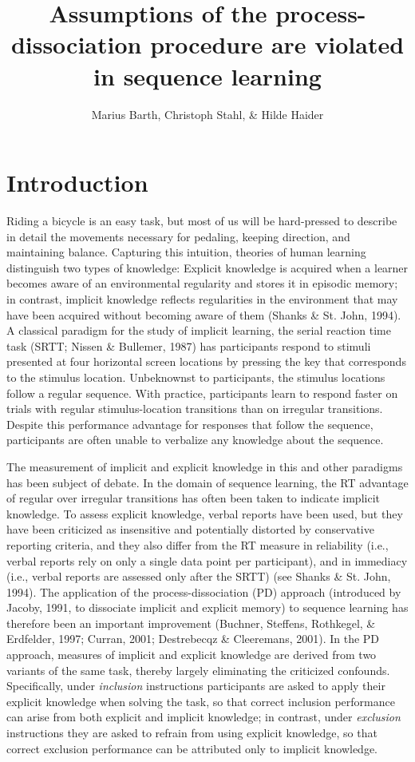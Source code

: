 \documentclass[floatsintext,man]{apa6}
\title{Assumptions of the process-dissociation procedure are violated in
sequence learning}
\author{Marius Barth, Christoph Stahl, \& Hilde Haider}
\affiliation{
    \vspace{0.5cm}
          \textsuperscript{} University of Cologne  }
\begin{document}
\maketitle



\section{Introduction}\label{introduction}

Riding a bicycle is an easy task, but most of us will be hard-pressed to
describe in detail the movements necessary for pedaling, keeping
direction, and maintaining balance. Capturing this intuition, theories
of human learning distinguish two types of knowledge: Explicit knowledge
is acquired when a learner becomes aware of an environmental regularity
and stores it in episodic memory; in contrast, implicit knowledge
reflects regularities in the environment that may have been acquired
without becoming aware of them (Shanks \& St. John, 1994). A classical
paradigm for the study of implicit learning, the serial reaction time
task (SRTT; Nissen \& Bullemer, 1987) has participants respond to
stimuli presented at four horizontal screen locations by pressing the
key that corresponds to the stimulus location. Unbeknownst to
participants, the stimulus locations follow a regular sequence. With
practice, participants learn to respond faster on trials with regular
stimulus-location transitions than on irregular transitions. Despite
this performance advantage for responses that follow the sequence,
participants are often unable to verbalize any knowledge about the
sequence.

The measurement of implicit and explicit knowledge in this and other
paradigms has been subject of debate. In the domain of sequence
learning, the RT advantage of regular over irregular transitions has
often been taken to indicate implicit knowledge. To assess explicit
knowledge, verbal reports have been used, but they have been criticized
as insensitive and potentially distorted by conservative reporting
criteria, and they also differ from the RT measure in reliability (i.e.,
verbal reports rely on only a single data point per participant), and in
immediacy (i.e., verbal reports are assessed only after the SRTT) (see
Shanks \& St. John, 1994). The application of the process-dissociation
(PD) approach (introduced by Jacoby, 1991, to dissociate implicit and
explicit memory) to sequence learning has therefore been an important
improvement (Buchner, Steffens, Rothkegel, \& Erdfelder, 1997; Curran,
2001; Destrebecqz \& Cleeremans, 2001). In the PD approach, measures of
implicit and explicit knowledge are derived from two variants of the
same task, thereby largely eliminating the criticized confounds.
Specifically, under \emph{inclusion} instructions participants are asked
to apply their explicit knowledge when solving the task, so that correct
inclusion performance can arise from both explicit and implicit
knowledge; in contrast, under \emph{exclusion} instructions they are
asked to refrain from using explicit knowledge, so that correct
exclusion performance can be attributed only to implicit knowledge.
\end{document}
